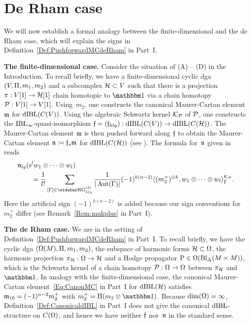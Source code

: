 \documentclass[\MainFolder/Text.tex]{subfiles}
\begin{document}
\section{De Rham case}

We will now establish a formal analogy between the finite-dimensional and the de Rham case, which will explain the signs in Definition~\ref{Def:PushforwardMCdeRham} in Part~I.

\textbf{The finite-dimensional case.} Consider the situation of (A) -- (D) in the Introduction. To recall briefly, we have a finite-dimensional cyclic dga $(V,\Pi,m_1, m_2)$ and a subcomplex $\mathcal{H} \subset V$ such that there is a projection $\pi: V[1] \rightarrow \mathcal{H}[1]$ chain homotopic to $\Id$ via a chain homotopy $\mathcal{P}: V[1] \rightarrow V[1]$. Using~$m_2$, one constructs the canonical Maurer-Cartan element $\mathfrak{m}$ for $\mathrm{dIBL}(C(V))$. Using the algebraic Schwartz kernel $\mathcal{K}_{\mathcal{P}}$ of $\mathcal{P}$, one constructs the $\mathrm{IBL}_\infty$-quasi-isomorphism $\mathfrak{f} = (\mathfrak{f}_{klg}): \mathrm{dIBL}(C(V)) \rightarrow \mathrm{dIBL}(C(\mathcal{H}))$. The Maurer-Cartan element $\mathfrak{m}$ is then pushed forward along $\mathfrak{f}$ to obtain the Maurer-Cartan element $\mathfrak{n} \coloneqq \mathfrak{f}_* \mathfrak{m}$  for $\mathrm{dIBL}(C(\mathcal{H}))$ (see \cite[Lemma 9.5]{Cieliebak2015}). The formula for~$\mathfrak{n}$ given in~\cite[Remark~12.10]{Cieliebak2015} reads
\begin{equation} \label{Eq:PushforwardMC}
\begin{aligned} &\PMC_{lg}(\Susp^l w_1 \otimes \dotsb \otimes  w_l) \\
&\qquad=\frac{1}{l!}\sum_{[\Gamma]\in \TRRG_{klg}} \frac{1}{\Abs{\Aut(\Gamma)}} (-1)^{k(n-2)}\langle (m_2^+)^{\otimes k}, w_1 \otimes \dotsb \otimes w_l \rangle_{\Gamma}^{\Kern_{\Htp}}.
\end{aligned}\end{equation}
Here the artificial sign $(-1)^{k(n-2)}$ is added because our sign conventions for $m_2^+$ differ (see Remark~\ref{Rem:mukplus} in Part~I).


\textbf{The de Rham case.}
We are in the setting of Definition~\ref{Def:PushforwardMCdeRham} in Part~I. To recall briefly, we have the cyclic dga $(\Omega(M), \Pi, m_1, m_2)$, the subspace of harmonic forms $\mathcal{H}\subset \Omega$, the harmonic projection $\pi_{\mathcal{H}}: \Omega\rightarrow \mathcal{H}$ and a Hodge propagator $\mathrm{P}\in \Omega(\mathrm{Bl}_\Delta(M\times M))$, which is the Schwartz kernel of a chain homotopy $\mathcal{P}: \Omega \rightarrow \Omega$ between $\pi_{\mathcal{H}}$ and~$\Id$. In analogy with the finite-dimensional case, the canonical Maurer-Cartan element~\eqref{Eq:CanonMC} in Part~I for $\mathrm{dIBL}(\mathcal{H})$ satisfies $\mathfrak{m}_{10} = (-1)^{n-2}m_2^+$ with $m_2^+ = \Pair(m_2 \otimes \Id)$. Because $\dim(\Omega) = \infty$, Definition~\ref{Def:CanonicaldIBL} in Part~I does not give the canonical $\mathrm{dIBL}$-structure on $C(\Omega)$, and hence we have neither $\mathfrak{f}$ nor~$\mathfrak{n}$ in the standard sense.
\end{document}

